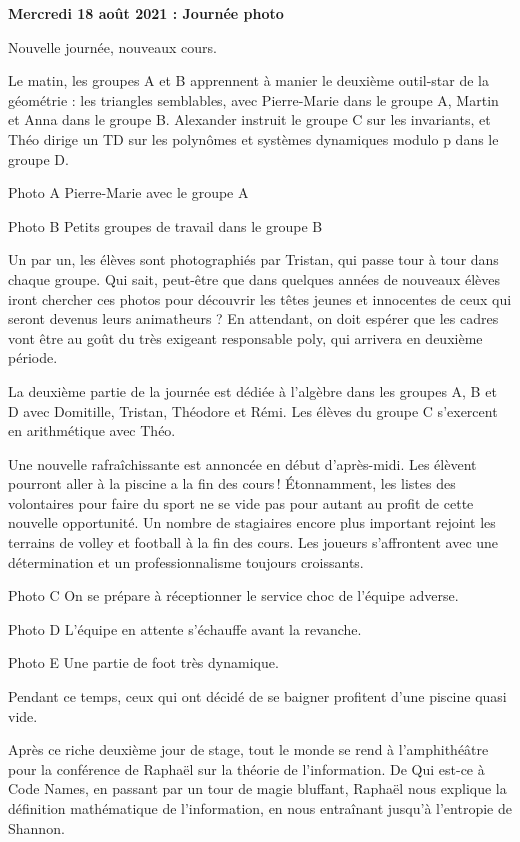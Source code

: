 \begin{center}
{\textbf{Mercredi 18 août 2021 : Journée photo}}
\end{center}
\vspace{2mm}

Nouvelle journée, nouveaux cours.

Le matin, les groupes A et B apprennent à manier le deuxième outil-star de la géométrie : les triangles semblables, avec Pierre-Marie dans le groupe A, Martin et Anna dans le groupe B. Alexander instruit le groupe C sur les invariants, et Théo dirige un TD sur les polynômes et systèmes dynamiques modulo p dans le groupe D.

Photo A
Pierre-Marie avec le groupe A

Photo B
Petits groupes de travail dans le groupe B

Un par un, les élèves sont photographiés par Tristan, qui passe tour à tour dans chaque groupe. Qui sait, peut-être que dans quelques années de nouveaux élèves iront chercher ces photos pour découvrir les têtes jeunes et innocentes de ceux qui seront devenus leurs animatheurs ? En attendant, on doit espérer que les cadres vont être au goût du très exigeant responsable poly, qui arrivera en deuxième période.

La deuxième partie de la journée est dédiée à l’algèbre dans les groupes A, B et D avec Domitille, Tristan, Théodore et Rémi. Les élèves du groupe C s’exercent en arithmétique avec Théo.

Une nouvelle rafraîchissante est annoncée en début d’après-midi. Les élèvent pourront aller à la piscine a la fin des cours ! Étonnamment, les listes des volontaires pour faire du sport ne se vide pas pour autant au profit de cette nouvelle opportunité. Un nombre de stagiaires encore plus important rejoint les terrains de volley et football à la fin des cours. Les joueurs s’affrontent avec une détermination et un professionnalisme toujours croissants.

Photo C
On se prépare à réceptionner le service choc de l’équipe adverse.

Photo D
L’équipe en attente s’échauffe avant la revanche.

Photo E
Une partie de foot très dynamique.

Pendant ce temps, ceux qui ont décidé de se baigner profitent d’une piscine quasi vide.

Après ce riche deuxième jour de stage, tout le monde se rend à l’amphithéâtre pour la conférence de Raphaël sur la théorie de l’information. De Qui est-ce à Code Names, en passant par un tour de magie bluffant, Raphaël nous explique la définition mathématique de l’information, en nous entraînant jusqu’à l’entropie de Shannon.

